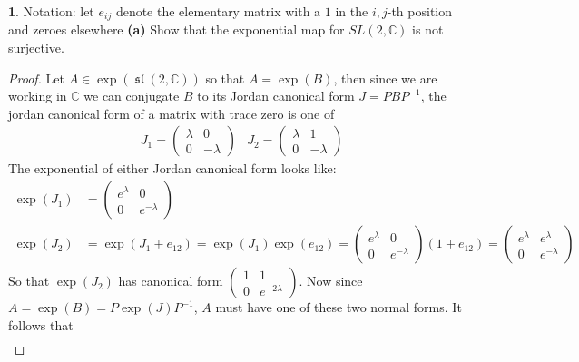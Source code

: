 \documentclass[10.5pt]{article}
\theoremstyle{definition}
\newtheorem{pb}{}
\newcommand{\spl}{\operatorname{\mathfrak{sl}}}
\begin{document}
    \begin{pb}
        Notation: let \(e_{ij}\) denote the elementary matrix with a \(1\) in the \(i,j\)-th position and zeroes elsewhere
         \textbf{(a)} Show that the exponential map for \(SL(2,\mathbb{C})\) is not surjective.
         \begin{proof}
            Let \(A \in \exp(\spl(2,\mathbb{C}))\) so that \(A = \exp(B)\), then since we are working in \(\mathbb{C}\) we can conjugate \(B\) to its Jordan canonical form \(J = PBP^{-1}\), the jordan canonical form of a matrix with trace zero is one of
            \begin{align*}
                &J_1 = \begin{pmatrix}
                    \lambda & 0 \\ 0 & -\lambda
                \end{pmatrix} &J_2 = \begin{pmatrix}
                    \lambda & 1 \\ 0 & -\lambda
                \end{pmatrix}
            \end{align*}
            The exponential of either Jordan canonical form looks like:
            \begin{align*}
                \exp(J_1) &= \begin{pmatrix}
                    e^{\lambda} & 0 \\ 0 & e^{-\lambda}
                \end{pmatrix} \\
                \exp(J_2) &= \exp(J_1 + e_{12}) = \exp(J_1)\exp(e_{12}) = \begin{pmatrix}
                    e^{\lambda} & 0 \\ 0 & e^{-\lambda}
                \end{pmatrix}(1 + e_{12}) = \begin{pmatrix}
                    e^\lambda & e^\lambda \\ 0 & e^{- \lambda}
                \end{pmatrix}
            \end{align*}
            So that \(\exp(J_2)\) has canonical form \(\begin{pmatrix} 1 & 1 \\ 0 & e^{-2 \lambda} \end{pmatrix}\). Now since \(A = \exp(B) = P\exp(J)P^{-1}\), \(A\) must have one of these two normal forms. It follows that
            \begin{align*}

\end{align*}
\end{proof}
\end{pb}
\end{document}
